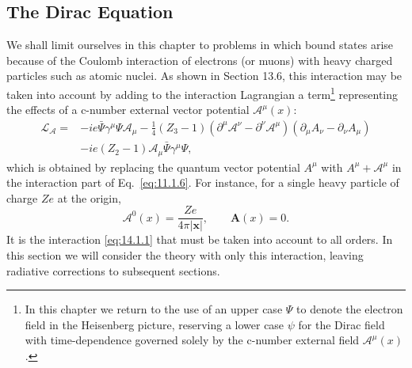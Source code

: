 
\subsection{The Dirac Equation}

We shall limit ourselves in this chapter to problems in which bound states
arise because of the Coulomb interaction of electrons (or muons) with heavy
charged particles such as atomic nuclei. As shown in Section 13.6, this
interaction may be taken into account by adding to the interaction Lagrangian
a term\footnote{In this chapter we return to the use of an upper case $\Psi$ to
denote the electron field in the Heisenberg picture, reserving a lower case
$\psi$ for the Dirac field with time-dependence governed solely by the c-number
external field $\mathcal A^\mu(x)$.} representing the effects of a c-number
external vector potential $\mathcal A^\mu(x)$:
\begin{equation}
\begin{aligned}
\mathcal L_{\mathcal A}={}&-ie\bar\Psi\gamma^\mu\Psi\mathcal A_\mu
-\frac14(Z_3-1)(\partial^\mu\mathcal A^\nu-\partial^\nu\mathcal A^\mu)
  (\partial_\mu A_\nu-\partial_\nu A_\mu)\\
&-ie(Z_2-1)\mathcal A_\mu\bar\Psi\gamma^\mu\Psi,
\end{aligned}
\tag{14.1.1}\label{eq:14.1.1}
\end{equation}
which is obtained by replacing the quantum vector potential $A^\mu$ with
$A^\mu+\mathcal A^\mu$ in the interaction part of Eq.~\eqref{eq:11.1.6}. For
instance, for a single heavy particle of charge $Ze$ at the origin,
\begin{equation}
  \mathcal A^0(x)=\frac{Ze}{4\pi|\mathbf x|},\qquad \mathbf A(x)=0.
  \tag{14.1.2}\label{eq:14.1.2}
\end{equation}
It is the interaction \eqref{eq:14.1.1} that must be taken into account to all
orders. In this section we will consider the theory with only this interaction,
leaving radiative corrections to subsequent sections.

